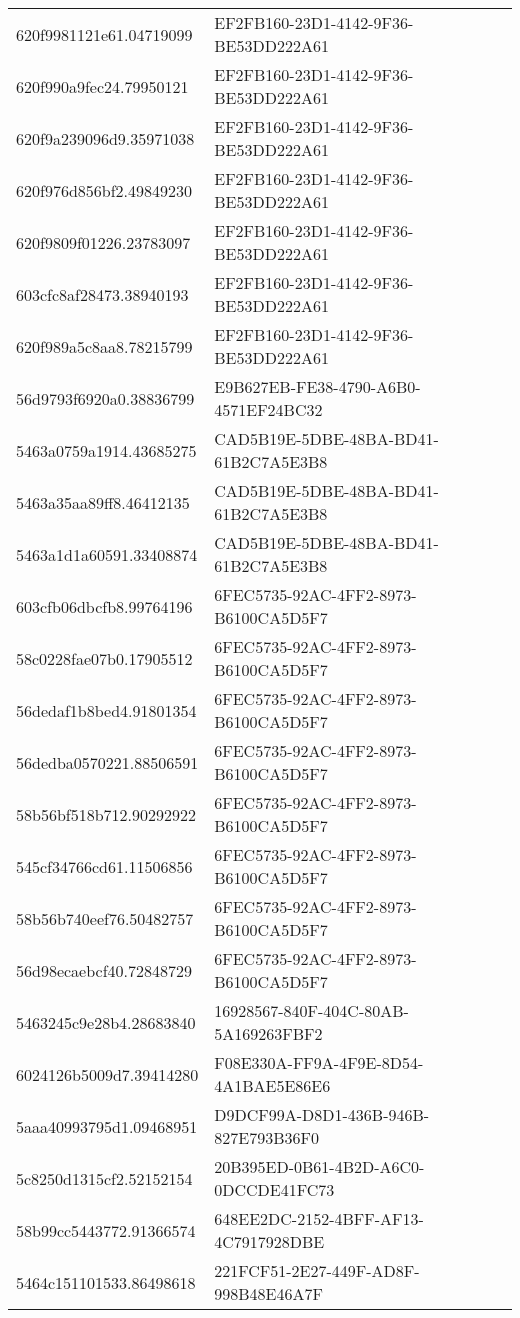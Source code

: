 \begin{tabular}{ll}
620f9981121e61.04719099 & EF2FB160-23D1-4142-9F36-BE53DD222A61 \\
620f990a9fec24.79950121 & EF2FB160-23D1-4142-9F36-BE53DD222A61 \\
620f9a239096d9.35971038 & EF2FB160-23D1-4142-9F36-BE53DD222A61 \\
620f976d856bf2.49849230 & EF2FB160-23D1-4142-9F36-BE53DD222A61 \\
620f9809f01226.23783097 & EF2FB160-23D1-4142-9F36-BE53DD222A61 \\
603cfc8af28473.38940193 & EF2FB160-23D1-4142-9F36-BE53DD222A61 \\
620f989a5c8aa8.78215799 & EF2FB160-23D1-4142-9F36-BE53DD222A61 \\
56d9793f6920a0.38836799 & E9B627EB-FE38-4790-A6B0-4571EF24BC32 \\
5463a0759a1914.43685275 & CAD5B19E-5DBE-48BA-BD41-61B2C7A5E3B8 \\
5463a35aa89ff8.46412135 & CAD5B19E-5DBE-48BA-BD41-61B2C7A5E3B8 \\
5463a1d1a60591.33408874 & CAD5B19E-5DBE-48BA-BD41-61B2C7A5E3B8 \\
603cfb06dbcfb8.99764196 & 6FEC5735-92AC-4FF2-8973-B6100CA5D5F7 \\
58c0228fae07b0.17905512 & 6FEC5735-92AC-4FF2-8973-B6100CA5D5F7 \\
56dedaf1b8bed4.91801354 & 6FEC5735-92AC-4FF2-8973-B6100CA5D5F7 \\
56dedba0570221.88506591 & 6FEC5735-92AC-4FF2-8973-B6100CA5D5F7 \\
58b56bf518b712.90292922 & 6FEC5735-92AC-4FF2-8973-B6100CA5D5F7 \\
545cf34766cd61.11506856 & 6FEC5735-92AC-4FF2-8973-B6100CA5D5F7 \\
58b56b740eef76.50482757 & 6FEC5735-92AC-4FF2-8973-B6100CA5D5F7 \\
56d98ecaebcf40.72848729 & 6FEC5735-92AC-4FF2-8973-B6100CA5D5F7 \\
5463245c9e28b4.28683840 & 16928567-840F-404C-80AB-5A169263FBF2 \\
6024126b5009d7.39414280 & F08E330A-FF9A-4F9E-8D54-4A1BAE5E86E6 \\
5aaa40993795d1.09468951 & D9DCF99A-D8D1-436B-946B-827E793B36F0 \\
5c8250d1315cf2.52152154 & 20B395ED-0B61-4B2D-A6C0-0DCCDE41FC73 \\
58b99cc5443772.91366574 & 648EE2DC-2152-4BFF-AF13-4C7917928DBE \\
5464c151101533.86498618 & 221FCF51-2E27-449F-AD8F-998B48E46A7F \\

\end{tabular}
